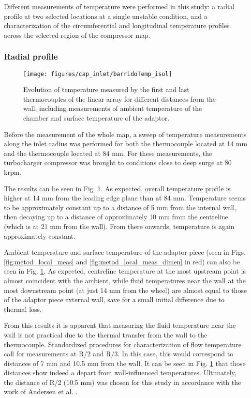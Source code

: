 Different measurements of temperature were performed in this study: a radial profile at two selected locations at a single unstable condition, and a characterization of the circumferential and longitudinal temperature profiles across the selected region of the compressor map.

\subsubsection{Radial profile}

\begin{figure}[b!]
\centering
\texttt{[image: figures/cap\_inlet/barridoTemp\_isol]}
\caption{Evolution of temperature measured by the first and last thermocouples of the linear array for different distances from the wall, including measurements of ambient temperature of the chamber and surface temperature of the adaptor.}
\label{fig:barrido_temp}
\end{figure}

Before the measurement of the whole map, a sweep of temperature measurements along the inlet radius was performed for both the thermocouple located at 14 mm and the thermocouple located at 84 mm. For these measurements, the turbocharger compressor was brought to conditions close to deep surge at 80 krpm.

The results can be seen in Fig. \ref{fig:barrido_temp}. As expected, overall temperature profile is higher at 14 mm from the leading edge plane than at 84 mm. Temperature seems to be approximately constant up to a distance of 5 mm from the internal wall, then decaying up to a distance of approximately 10 mm from the centreline (which is at 21 mm from the wall). From there onwards, temperature is again approximately constant.

Ambient temperature and surface temperature of the adaptor piece (seen in Figs. \ref{fig:metod_local_meas} and \ref{fig:metod_local_meas_dimen} in red) can also be seen in Fig. \ref{fig:barrido_temp}. As expected, centreline temperature at the most upstream point is almost coincident with the ambient, while fluid temperatures near the wall at the most downstream point (at just 14 mm from the wheel) are almost equal to those of the adaptor piece external wall, save for a small initial difference due to thermal loss.

From this results it is apparent that measuring the fluid temperature near the wall is not practical due to the thermal transfer from the wall to the thermocouple. Standardized procedures for characterization of flow temperature call for measurements at R/2 and R/3. In this case, this would correspond to distances of 7 mm and 10.5 mm from the wall. It can be seen in Fig. \ref{fig:barrido_temp} that those distances show indeed a depart from wall-influenced temperatures. Ultimately, the distance of R/2 (10.5 mm) was chosen for this study in accordance with the work of Andersen et al. \cite{andersen2009surge}.

